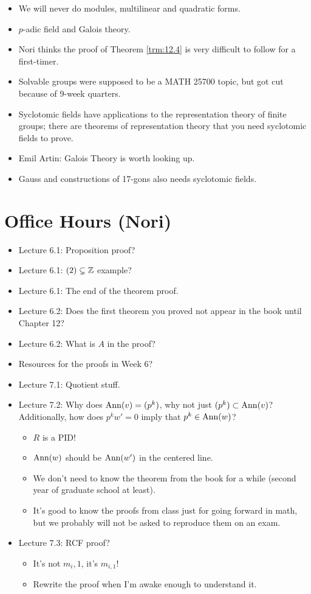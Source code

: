 \documentclass[../notes.tex]{subfiles}
\begin{document}
\begin{itemize}
\begin{itemize}
        \item We will never do modules, multilinear and quadratic forms.
        \item $p$-adic field and Galois theory.
        \item Nori thinks the proof of Theorem \ref{trm:12.4} is very difficult to follow for a first-timer.
        \item Solvable groups were supposed to be a MATH 25700 topic, but got cut because of 9-week quarters.
        \item Syclotomic fields have applications to the representation theory of finite groups; there are theorems of representation theory that you need syclotomic fields to prove.
        \item Emil Artin: Galois Theory is worth looking up.
        \item Gauss and constructions of 17-gons also needs syclotomic fields.
    \end{itemize}
\end{itemize}



\section{Office Hours (Nori)}
\begin{itemize}
    \item {}Lecture 6.1: Proposition proof?
    \item Lecture 6.1: $(2)\subsetneq\mathbb{Z}$ example?
    \item Lecture 6.1: The end of the theorem proof.
    \item Lecture 6.2: Does the first theorem you proved not appear in the book until Chapter 12?
    \item Lecture 6.2: What is $A$ in the proof?
    \item Resources for the proofs in Week 6?
    \item Lecture 7.1: Quotient stuff.
    \item Lecture 7.2: Why does $\operatorname{Ann}(v)=(p^k)$, why not just $(p^k)\subset\operatorname{Ann}(v)$? Additionally, how does $p^kw'=0$ imply that $p^k\in\operatorname{Ann}(w)$?
    \begin{itemize}
        \item $R$ is a PID!
        \item $\operatorname{Ann}(w)$ should be $\operatorname{Ann}(w')$ in the centered line.
        \item We don't need to know the theorem from the book for a while (second year of graduate school at least).
        \item It's good to know the proofs from class just for going forward in math, but we probably will not be asked to reproduce them on an exam.
    \end{itemize}
    \item Lecture 7.3: RCF proof?
    \begin{itemize}
        \item It's not $m_i,1$, it's $m_{i,1}$!
        \item Rewrite the proof when I'm awake enough to understand it.
    \end{itemize}
\end{itemize}
\end{document}
